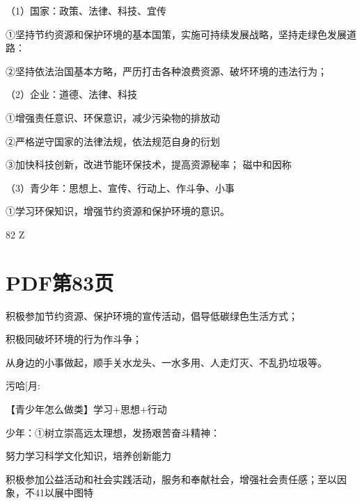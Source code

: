 \documentclass[lang=cn,11pt]{elegantbook}
\newcommand{\daofasym}[1]{{\daofasymbolfont #1}}
\newcommand{\daofasym}[1]{#1}
\begin{document}
（1）国家：政策、法律、科技、宜传\par

\daofasym{①}坚持节约资源和保护环境的基本国策，实施可持续发展战略，坚持走绿色发展道路：\par

\daofasym{②}坚持依法治国基本方略，严历打击各种浪费资源、破坏环境的违法行为；\par

（2）企业：道德、法律、科技\par

\daofasym{①}增强责任意识、环保意识，减少污染物的排放动\par

\daofasym{②}严格逆守国家的法律法规，依法规范自身的衍划\par

\daofasym{③}加快科技创新，改进节能环保技术，提高资源秘率； 磁中和因称\par

（3）青少年：思想上、宣传、行动上、作斗争、小事\par

\daofasym{①}学习环保知识，增强节约资源和保护环境的意识。\par

82 Z\par


\section*{PDF第83页}

积极参加节约资源、保护环境的宣传活动，倡导低碳绿色生活方式；\par

积极同破坏环境的行为作斗争；\par

从身边的小事做起，顺手关水龙头、一水多用、人走灯灭、不乱扔垃圾等。\par

污哈[月:\par

【青少年怎么做类】学习+思想+行动\par

少年：\daofasym{①}树立崇高远太理想，发扬艰苦奋斗精神：\par

努力学习科学文化知识，培养创新能力\par

积极参加公益活动和社会实践活动，服务和奉献社会，增强社会责任感；至以因象，不41以展中图特\par
\end{document}
